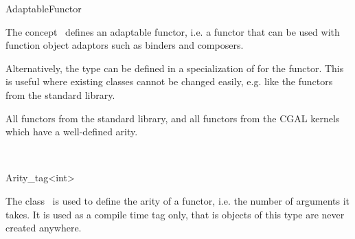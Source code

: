\begin{ccRefFunctionObjectConcept}{AdaptableFunctor}
  
  \ccDefinition The concept \ccRefName\ defines an adaptable functor,
  i.e. a functor that can be used with function object adaptors such
  as binders and composers.

  \ccTypes 
  
  
  \ccOperations
  
  \ccTagFullDeclarations{}
    \ccTagDefaults
    
   Alternatively, the type can be defined in a
  specialization of  for the functor. This
  is useful where existing classes cannot be changed easily, e.g. like
  the functors from the standard library.
  
  \ccHasModels All functors from the standard library, and all
  functors from the CGAL kernels which have a well-defined arity.
  
  \ccSeeAlso
  \\

\end{ccRefFunctionObjectConcept}

\begin{ccRefClass}{Arity_tag<int>}
  
  \ccDefinition The class \ccRefName\ is used to define the arity of a
  functor, i.e. the number of arguments it takes. It is used as a
  compile time tag only, that is objects of this type are never
  created anywhere.


  \ccSeeAlso

\end{ccRefClass}

